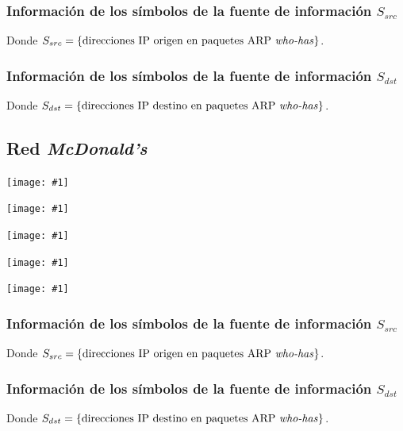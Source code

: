 \documentclass[a4paper, 10pt, twoside]{article}
\newcommand{\grafo}[1]{
  \texttt{[image: \#1]}
}
\begin{document}
\subsubsection{Información de los símbolos de la fuente de información $S_{src}$}

Donde $S_{src} = \{ \text{direcciones IP origen en paquetes ARP \emph{who-has}} \}$.


\vspace{2cm}


\subsubsection{Información de los símbolos de la fuente de información $S_{dst}$}

Donde $S_{dst} = \{ \text{direcciones IP destino en paquetes ARP \emph{who-has}} \}$.


\vspace{2cm}




\subsection{Red \emph{McDonald's}}

\grafo{mcdonalds}

\grafo{mcdonalds-172.17.12.2}

\grafo{mcdonalds-172.17.12.1}

\grafo{mcdonalds-172.17.203.1}

\grafo{mcdonalds-0.0.0.0}


\subsubsection{Información de los símbolos de la fuente de información $S_{src}$}

Donde $S_{src} = \{ \text{direcciones IP origen en paquetes ARP \emph{who-has}} \}$.


\vspace{2cm}


\subsubsection{Información de los símbolos de la fuente de información $S_{dst}$}

Donde $S_{dst} = \{ \text{direcciones IP destino en paquetes ARP \emph{who-has}} \}$.
\end{document}
